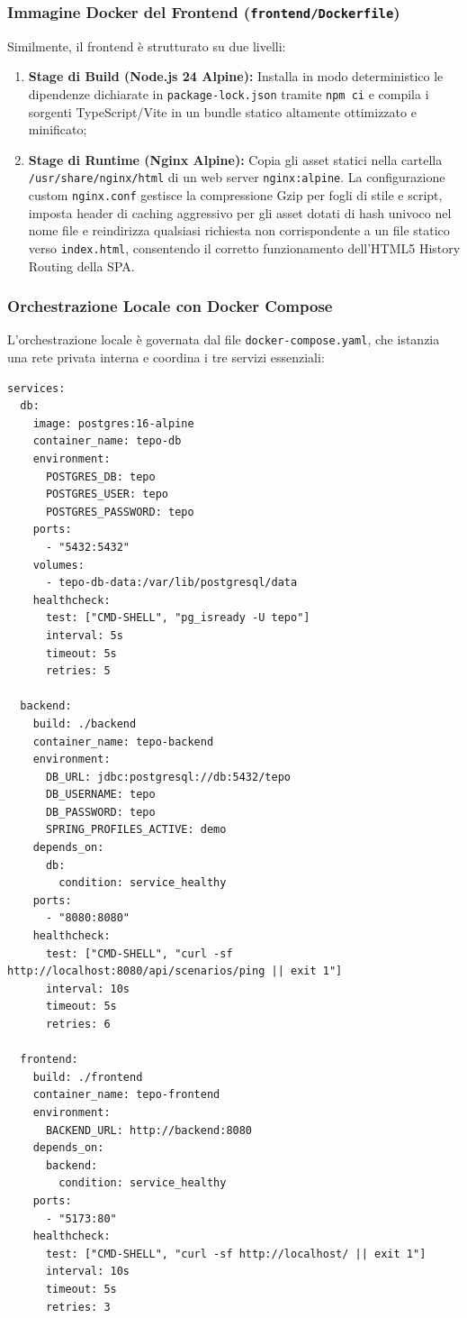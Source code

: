 \subsubsection{Immagine Docker del Frontend (\texttt{frontend/Dockerfile})}
Similmente, il frontend è strutturato su due livelli:
\begin{enumerate}[leftmargin=1.5em, itemsep=0.2em]
    \item \textbf{Stage di Build (Node.js 24 Alpine):} Installa in modo deterministico le dipendenze dichiarate in \texttt{package-lock.json} tramite \texttt{npm ci} e compila i sorgenti TypeScript/Vite in un bundle statico altamente ottimizzato e minificato;
    \item \textbf{Stage di Runtime (Nginx Alpine):} Copia gli asset statici nella cartella \texttt{/usr/share/nginx/html} di un web server \texttt{nginx:alpine}. La configurazione custom \texttt{nginx.conf} gestisce la compressione Gzip per fogli di stile e script, imposta header di caching aggressivo per gli asset dotati di hash univoco nel nome file e reindirizza qualsiasi richiesta non corrispondente a un file statico verso \texttt{index.html}, consentendo il corretto funzionamento dell'HTML5 History Routing della SPA.
\end{enumerate}

\subsubsection{Orchestrazione Locale con Docker Compose}
L'orchestrazione locale è governata dal file \texttt{docker-compose.yaml}, che istanzia una rete privata interna e coordina i tre servizi essenziali:
\begin{lstlisting}[caption={Configurazione dei servizi in docker-compose.yaml.}]
services:
  db:
    image: postgres:16-alpine
    container_name: tepo-db
    environment:
      POSTGRES_DB: tepo
      POSTGRES_USER: tepo
      POSTGRES_PASSWORD: tepo
    ports:
      - "5432:5432"
    volumes:
      - tepo-db-data:/var/lib/postgresql/data
    healthcheck:
      test: ["CMD-SHELL", "pg_isready -U tepo"]
      interval: 5s
      timeout: 5s
      retries: 5

  backend:
    build: ./backend
    container_name: tepo-backend
    environment:
      DB_URL: jdbc:postgresql://db:5432/tepo
      DB_USERNAME: tepo
      DB_PASSWORD: tepo
      SPRING_PROFILES_ACTIVE: demo
    depends_on:
      db:
        condition: service_healthy
    ports:
      - "8080:8080"
    healthcheck:
      test: ["CMD-SHELL", "curl -sf http://localhost:8080/api/scenarios/ping || exit 1"]
      interval: 10s
      timeout: 5s
      retries: 6

  frontend:
    build: ./frontend
    container_name: tepo-frontend
    environment:
      BACKEND_URL: http://backend:8080
    depends_on:
      backend:
        condition: service_healthy
    ports:
      - "5173:80"
    healthcheck:
      test: ["CMD-SHELL", "curl -sf http://localhost/ || exit 1"]
      interval: 10s
      timeout: 5s
      retries: 3
\end{lstlisting}

